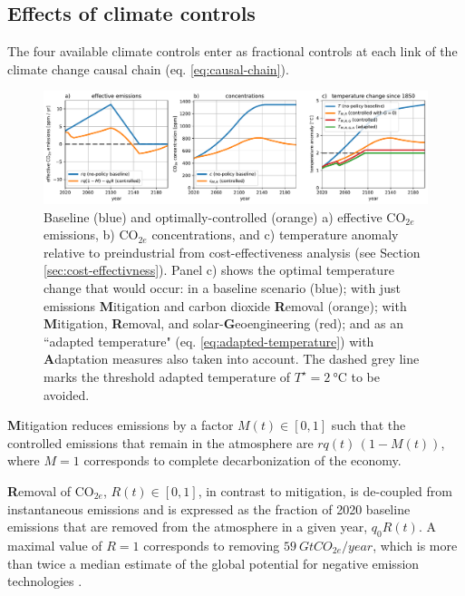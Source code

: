 \documentclass[9pt,twocolumn,twoside,lineno]{pnas-new}
\begin{document}
\subsection*{Effects of climate controls}

The four available climate controls enter as fractional controls at each link of the climate change causal chain (eq. \ref{eq:causal-chain}).

\begin{figure}%
\centering
\includegraphics[width=17.8cm]{figures/default-temp_carbon_and_temperatures.pdf}
\caption{Baseline (blue) and optimally-controlled (orange) a) effective CO$_{2e}$ emissions, b) CO$_{2e}$ concentrations, and c) temperature anomaly relative to preindustrial from cost-effectiveness analysis (see Section \ref{sec:cost-effectivness}). Panel c) shows the optimal temperature change that would occur: in a baseline scenario (blue); with just emissions \textbf{M}itigation and carbon dioxide \textbf{R}emoval (orange); with \textbf{M}itigation, \textbf{R}emoval, and solar-\textbf{G}eoengineering (red); and as an ``adapted temperature" (eq. \ref{eq:adapted-temperature}) with \textbf{A}daptation measures also taken into account. The dashed grey line marks the threshold adapted temperature of $T^{\star} = \SI{2}{\celsius}$ to be avoided.}
\label{fig:carbon_and_temperature}
\end{figure}

\textbf{M}itigation reduces emissions by a factor $M(t) \in [0,1]$ such that the controlled emissions that remain in the atmosphere are $rq(t)\,(1-M(t))$, where $M = 1$ corresponds to complete decarbonization of the economy.

\textbf{R}emoval of CO$_{2e}$, $R(t) \in [0,1]$, in contrast to mitigation, is de-coupled from instantaneous emissions and is expressed as the fraction of 2020 baseline emissions that are removed from the atmosphere in a given year, $q_{0}R(t)$. A maximal value of $R=1$ corresponds to removing $\SI{59}{GtCO_{2e} / year}$, which is more than twice a median estimate of the global potential for negative emission technologies \cite{fuss_negative_2018}.
\end{document}
